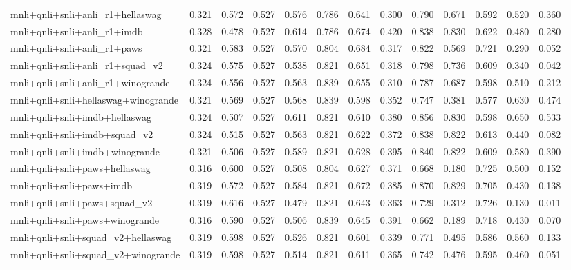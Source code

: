 \begin{table}[t]
\begin{tabular}{lrrrrrrrrrrrr}
    mnli+qnli+snli+anli\_r1+hellaswag & 0.321 & 0.572 & 0.527 & 0.576 & 0.786 & 0.641 & 0.300 & 0.790 & 0.671 & 0.592 & 0.520 & 0.360 \\
    mnli+qnli+snli+anli\_r1+imdb & 0.328 & 0.478 & 0.527 & 0.614 & 0.786 & 0.674 & 0.420 & 0.838 & 0.830 & 0.622 & 0.480 & 0.280 \\
    mnli+qnli+snli+anli\_r1+paws & 0.321 & 0.583 & 0.527 & 0.570 & 0.804 & 0.684 & 0.317 & 0.822 & 0.569 & 0.721 & 0.290 & 0.052 \\
    mnli+qnli+snli+anli\_r1+squad\_v2 & 0.324 & 0.575 & 0.527 & 0.538 & 0.821 & 0.651 & 0.318 & 0.798 & 0.736 & 0.609 & 0.340 & 0.042 \\
    mnli+qnli+snli+anli\_r1+winogrande & 0.324 & 0.556 & 0.527 & 0.563 & 0.839 & 0.655 & 0.310 & 0.787 & 0.687 & 0.598 & 0.510 & 0.212 \\
    mnli+qnli+snli+hellaswag+winogrande & 0.321 & 0.569 & 0.527 & 0.568 & 0.839 & 0.598 & 0.352 & 0.747 & 0.381 & 0.577 & 0.630 & 0.474 \\
    mnli+qnli+snli+imdb+hellaswag & 0.324 & 0.507 & 0.527 & 0.611 & 0.821 & 0.610 & 0.380 & 0.856 & 0.830 & 0.598 & 0.650 & 0.533 \\
    mnli+qnli+snli+imdb+squad\_v2 & 0.324 & 0.515 & 0.527 & 0.563 & 0.821 & 0.622 & 0.372 & 0.838 & 0.822 & 0.613 & 0.440 & 0.082 \\
    mnli+qnli+snli+imdb+winogrande & 0.321 & 0.506 & 0.527 & 0.589 & 0.821 & 0.628 & 0.395 & 0.840 & 0.822 & 0.609 & 0.580 & 0.390 \\
    mnli+qnli+snli+paws+hellaswag & 0.316 & 0.600 & 0.527 & 0.508 & 0.804 & 0.627 & 0.371 & 0.668 & 0.180 & 0.725 & 0.500 & 0.152 \\
    mnli+qnli+snli+paws+imdb & 0.319 & 0.572 & 0.527 & 0.584 & 0.821 & 0.672 & 0.385 & 0.870 & 0.829 & 0.705 & 0.430 & 0.138 \\
    mnli+qnli+snli+paws+squad\_v2 & 0.319 & 0.616 & 0.527 & 0.479 & 0.821 & 0.643 & 0.363 & 0.729 & 0.312 & 0.726 & 0.130 & 0.011 \\
    mnli+qnli+snli+paws+winogrande & 0.316 & 0.590 & 0.527 & 0.506 & 0.839 & 0.645 & 0.391 & 0.662 & 0.189 & 0.718 & 0.430 & 0.070 \\
    mnli+qnli+snli+squad\_v2+hellaswag & 0.319 & 0.598 & 0.527 & 0.526 & 0.821 & 0.601 & 0.339 & 0.771 & 0.495 & 0.586 & 0.560 & 0.133 \\
    mnli+qnli+snli+squad\_v2+winogrande & 0.319 & 0.598 & 0.527 & 0.514 & 0.821 & 0.611 & 0.365 & 0.742 & 0.476 & 0.595 & 0.460 & 0.051 \\

\end{tabular}
\end{table}
